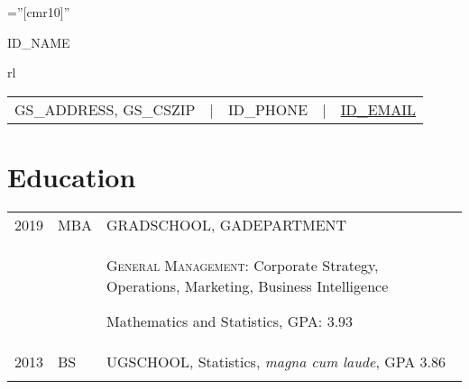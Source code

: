 \documentclass[a4paper,10pt]{article}
\begin{document}

\sloppy







\font\fb=''[cmr10]'' %

\par{\centering
		{\Huge  \textsc{ID_NAME}}
		\smallskip \par
		\begin{tabular}{rl}
		\small
		\begin{tabular}{rllll}
			GS_ADDRESS, GS_CSZIP 	&
			| & ID_PHONE			&
    		| & \href{mailto:ID_EMAIL}{ID_EMAIL}	\\
		\end{tabular}
		\end{tabular}
		\bigskip
		\par}






\smallskip
\section{Education}
\begin{supertabular}{p{2cm} p{1.0cm} p{13.9cm}}
	\textsc{2019}		&		\textsc{MBA} & \textsc{GRADSCHOOL}, \small GADEPARTMENT \\
					&&		 \begin{enumerate*}[label =$\diamond$, itemjoin={\newline}]
							 \item \footnotesize  \textsc{General Management:} Corporate Strategy, Operations, Marketing, Business Intelligence
							 \item \footnotesize Mathematics and Statistics, GPA: 3.93
							 \end{enumerate*}  \\
	\textsc{2013} 	& 	\textsc{BS} & \textsc{UGSCHOOL}, \small Statistics, \emph{magna cum laude}, GPA 3.86 \\
	 \\
\end{supertabular}
\end{document}
